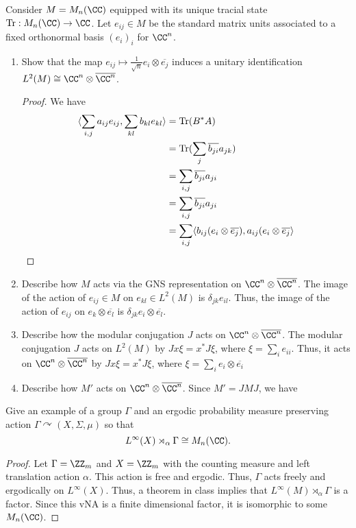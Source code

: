 \documentclass{article}
\begin{document}
 Consider $M = M_n(\CC)$ equipped with its unique tracial state $\tr : M_n(\CC) \to \CC$. Let $e_{ij} \in M$ be
the standard matrix units associated to a fixed orthonormal basis $(e_i)_i$ for $\CC^n$.
\begin{enumerate}
\item Show that the map $e_{ij} \mapsto \frac{1}{\sqrt{n}} e_i \otimes \overline{e_j}$ induces a unitary identification
  $L^2(M) \cong \CC^n \otimes \overline{\CC^n}$.
  \begin{proof}
    We have
    \begin{align*}
      \langle \sum_{i,j} a_{ij} e_{ij}, \sum_{kl} b_{kl} e_{kl} \rangle & = \operatorname{Tr}(B^* A) \\
      & = \operatorname{Tr}(\sum_j \overline{b_{ji}} a_{jk}) \\
      & = \sum_{i,j} \overline{b_{ji}} a_{ji} \\
      & = \sum_{i,j} \overline{b_{ji}} a_{ji} \\
      & = \sum_{i,j} \langle b_{ij} (e_i \otimes \overline{e_j}),  a_{ij} (e_i \otimes \overline{e_j} \rangle \\
    \end{align*}
  \end{proof}
\item Describe how $M$ acts via the GNS representation on $\CC^n \otimes \overline{\CC^n}$.
  The image of the action of $e_{ij} \in M$ on $e_{kl} \in L^2(M)$ is $\delta_{jk} e_{il}$.  Thus,
  the image of the action of $e_{ij}$ on $e_k \otimes \overline{e_l}$ is $\delta_{jk} e_i \otimes \overline{e_l}$.
    
  \item Describe how the modular conjugation $J$ acts on $\CC^n \otimes \overline{\CC^n}$.
    The modular conjugation $J$ acts on $L^2(M)$ by $Jx \xi = x^* J \xi$, where $\xi = \sum_i e_{ii}$.  Thus, it
    acts on $\CC^n \otimes \overline{\CC^n}$ by $J x \xi = x^* J \xi$, where $\xi = \sum_i e_i \otimes \overline{e_i}$
  
  \item Describe how $M'$ acts on $\CC^n \otimes \overline{\CC^n}$.
    Since $M' = JMJ$, we have
\end{enumerate}

 Give an example of a group $\Gamma$ and an ergodic probability measure preserving action $\Gamma \curvearrowright (X, \Sigma, \mu)$ so that
$$L^\infty(X) \rtimes_\alpha \Gamma \cong M_n(\CC).$$
\begin{proof}
  Let $\Gamma = \ZZ_m$ and $X = \ZZ_m$ with the counting measure and left translation action $\alpha$.  This action is free and ergodic.  Thus, $\Gamma$ acts freely and ergodically on $L^\infty(X)$.  Thus, a theorem in class implies that $L^\infty(M) \rtimes_\alpha \Gamma$ is a factor.  Since this vNA is a finite dimensional factor, it is isomorphic to some $M_n(\CC)$.
\end{proof}
\end{document}
